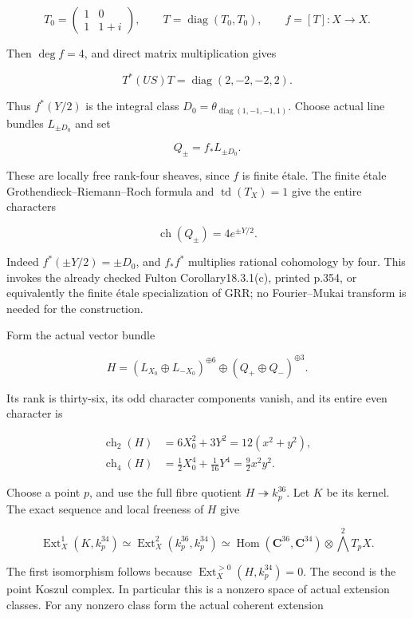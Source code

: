 \[
 T_0=\begin{pmatrix}1&0\\1&1+i\end{pmatrix},\qquad
 T=\operatorname{diag}(T_0,T_0),\qquad f=[T]:X\to X.
\]

Then \(\deg f=4\), and direct matrix multiplication gives

\[
 T^*(US)T=\operatorname{diag}(2,-2,-2,2).
 \tag{E819.14}
\]

Thus \(f^*(Y/2)\) is the integral class
\(D_0=\theta_{\operatorname{diag}(1,-1,-1,1)}\). Choose actual line
bundles \(L_{\pm D_0}\) and set

\[
 Q_\pm=f_*L_{\pm D_0}.
\]

These are locally free rank-four sheaves, since \(f\) is finite étale.
The finite étale Grothendieck--Riemann--Roch formula and
\(\operatorname{td}(T_X)=1\) give the entire characters

\[
 \operatorname{ch}(Q_\pm)=4e^{\pm Y/2}.
 \tag{E819.15}
\]

Indeed \(f^*(\pm Y/2)=\pm D_0\), and \(f_*f^*\) multiplies rational
cohomology by four. This invokes the already checked Fulton
Corollary18.3.1(c), printed p.354, or equivalently the finite étale
specialization of GRR; no Fourier--Mukai transform is needed for the
construction.

Form the actual vector bundle

\[
 H=(L_{X_0}\oplus L_{-X_0})^{\oplus6}
            \oplus(Q_+\oplus Q_-)^{\oplus3}.
 \tag{E819.16}
\]

Its rank is thirty-six, its odd character components vanish, and its
entire even character is

\[
 \begin{aligned}
 \operatorname{ch}_2(H)&=6X_0^2+3Y^2=12(x^2+y^2),\\
 \operatorname{ch}_4(H)&=\tfrac12 X_0^4+\tfrac1{16}Y^4
                         =\tfrac92 x^2y^2.
 \end{aligned}
 \tag{E819.17}
\]

Choose a point \(p\), and use the full fibre quotient
\(H\twoheadrightarrow k_p^{36}\). Let \(K\) be its kernel. The exact
sequence and local freeness of \(H\) give

\[
 \operatorname{Ext}^1_X(K,k_p^{34})
     \simeq\operatorname{Ext}^2_X(k_p^{36},k_p^{34})
     \simeq\operatorname{Hom}(\mathbf C^{36},\mathbf C^{34})
                   \otimes\bigwedge^2T_pX.
 \tag{E819.18}
\]

The first isomorphism follows because
\(\operatorname{Ext}^{>0}_X(H,k_p^{34})=0\). The second is the point
Koszul complex. In particular this is a nonzero space of actual
extension classes. For any nonzero class form the actual coherent
extension

